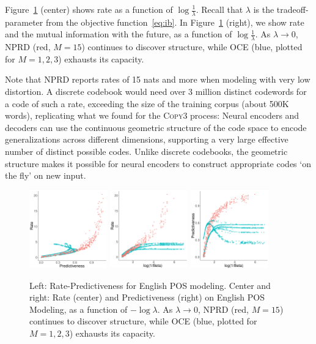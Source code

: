 \documentclass[11pt,letterpaper]{article}
\begin{document}
Figure~\ref{fig:eng-pos} (center) shows rate as a function of $\log \frac{1}{\lambda}$.
Recall that $\lambda$ is the tradeoff-parameter from the objective function~\ref{eq:ib}.
In Figure~\ref{fig:eng-pos} (right), we show rate and the mutual information with the future, as a function of $\log \frac{1}{\lambda}$.
As $\lambda \rightarrow 0$, NPRD (red, $M=15$) continues to discover structure, while OCE (blue, plotted for $M=1,2,3$) exhausts its capacity.

Note that NPRD reports rates of 15 nats and more when modeling with very low distortion.
A discrete codebook would need over 3 million distinct codewords for a code of such a rate, exceeding the size of the training corpus (about 500K words), replicating what we found for the \textsc{Copy3} process:
Neural encoders and decoders can use the continuous geometric structure of the code space to encode generalizations across different dimensions, supporting a very large effective number of distinct possible codes.
Unlike discrete codebooks, the geometric structure makes it possible for neural encoders to construct appropriate codes `on the fly' on new input.



\begin{figure}
\includegraphics[width=0.3\textwidth]{code/figures/english-info.pdf}
\includegraphics[width=0.3\textwidth]{code/figures/english-nlogbeta-mem.pdf}
\includegraphics[width=0.3\textwidth]{code/figures/english-nlogbeta-ee.pdf}
	\caption{Left: Rate-Predictiveness for English POS modeling. Center and right: Rate (center) and Predictiveness (right) on English POS Modeling, as a function of $-\log \lambda$. As $\lambda \rightarrow 0$, NPRD (red, $M=15$) continues to discover structure, while OCE (blue, plotted for $M=1,2,3$) exhausts its capacity.}\label{fig:eng-pos}
\end{figure}
\end{document}
